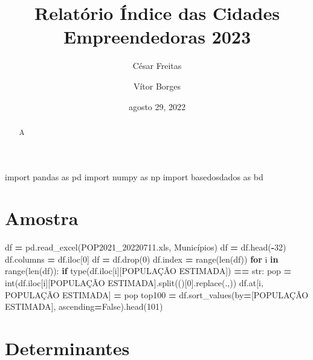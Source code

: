 \documentclass[
  12,
  dvipsnames]{article}
\title{Relatório Índice das Cidades Empreendedoras 2023}
\author{César Freitas \and Vítor Borges}
\date{agosto 29, 2022}
\newenvironment{Shaded}{\begin{snugshade}}{\end{snugshade}}
\newcommand{\BuiltInTok}[1]{#1}
\newcommand{\ControlFlowTok}[1]{\textcolor[rgb]{0.13,0.29,0.53}{\textbf{#1}}}
\newcommand{\DecValTok}[1]{\textcolor[rgb]{0.00,0.00,0.81}{#1}}
\newcommand{\ImportTok}[1]{#1}
\newcommand{\KeywordTok}[1]{\textcolor[rgb]{0.13,0.29,0.53}{\textbf{#1}}}
\newcommand{\NormalTok}[1]{#1}
\newcommand{\OperatorTok}[1]{\textcolor[rgb]{0.81,0.36,0.00}{\textbf{#1}}}
\newcommand{\StringTok}[1]{\textcolor[rgb]{0.31,0.60,0.02}{#1}}
\newcommand{\VariableTok}[1]{\textcolor[rgb]{0.00,0.00,0.00}{#1}}
\begin{document}
\maketitle
\begin{abstract}
A
\end{abstract}

\renewcommand*\contentsname{Sumário}
{
\setcounter{tocdepth}{2}
\tableofcontents
}
\newpage

\begin{Shaded}
\begin{Highlighting}[]
\ImportTok{import}\NormalTok{ pandas }\ImportTok{as}\NormalTok{ pd}
\ImportTok{import}\NormalTok{ numpy }\ImportTok{as}\NormalTok{ np}
\ImportTok{import}\NormalTok{ basedosdados }\ImportTok{as}\NormalTok{ bd}
\end{Highlighting}
\end{Shaded}

\hypertarget{amostra}{%
\section{Amostra}\label{amostra}}

\begin{Shaded}
\begin{Highlighting}[]
\NormalTok{df }\OperatorTok{=}\NormalTok{ pd.read\_excel(}\StringTok{\textquotesingle{}POP2021\_20220711.xls\textquotesingle{}}\NormalTok{, }\StringTok{\textquotesingle{}Municípios\textquotesingle{}}\NormalTok{)}
\NormalTok{df }\OperatorTok{=}\NormalTok{ df.head(}\OperatorTok{{-}}\DecValTok{32}\NormalTok{)}
\NormalTok{df.columns }\OperatorTok{=}\NormalTok{ df.iloc[}\DecValTok{0}\NormalTok{]}
\NormalTok{df }\OperatorTok{=}\NormalTok{ df.drop(}\DecValTok{0}\NormalTok{)}
\NormalTok{df.index }\OperatorTok{=} \BuiltInTok{range}\NormalTok{(}\BuiltInTok{len}\NormalTok{(df))}
\ControlFlowTok{for}\NormalTok{ i }\KeywordTok{in} \BuiltInTok{range}\NormalTok{(}\BuiltInTok{len}\NormalTok{(df)):}
    \ControlFlowTok{if} \BuiltInTok{type}\NormalTok{(df.iloc[i][}\StringTok{\textquotesingle{}POPULAÇÃO ESTIMADA\textquotesingle{}}\NormalTok{]) }\OperatorTok{==} \BuiltInTok{str}\NormalTok{:}
\NormalTok{        pop }\OperatorTok{=} \BuiltInTok{int}\NormalTok{(df.iloc[i][}\StringTok{\textquotesingle{}POPULAÇÃO ESTIMADA\textquotesingle{}}\NormalTok{].split(}\StringTok{\textquotesingle{}(\textquotesingle{}}\NormalTok{)[}\DecValTok{0}\NormalTok{].replace(}\StringTok{\textquotesingle{}.\textquotesingle{}}\NormalTok{,}\StringTok{\textquotesingle{}\textquotesingle{}}\NormalTok{))}
\NormalTok{        df.at[i, }\StringTok{\textquotesingle{}POPULAÇÃO ESTIMADA\textquotesingle{}}\NormalTok{] }\OperatorTok{=}\NormalTok{ pop}
\NormalTok{top100 }\OperatorTok{=}\NormalTok{ df.sort\_values(by}\OperatorTok{=}\NormalTok{[}\StringTok{\textquotesingle{}POPULAÇÃO ESTIMADA\textquotesingle{}}\NormalTok{], ascending}\OperatorTok{=}\VariableTok{False}\NormalTok{).head(}\DecValTok{101}\NormalTok{)}
\end{Highlighting}
\end{Shaded}

\hypertarget{determinantes}{%
\section{Determinantes}\label{determinantes}}
\end{document}
